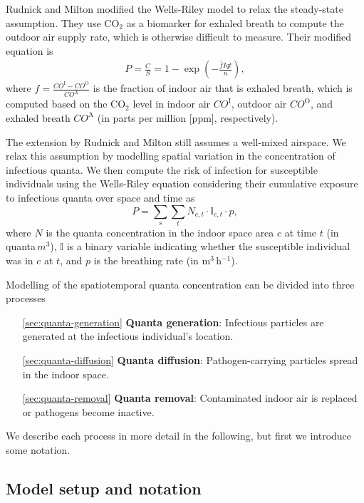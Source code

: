 \documentclass[fleqn,11pt]{wlscirep_supp}
\begin{document}
Rudnick and Milton\cite{Rudnick2003IndoorAir} modified the Wells-Riley model to relax the steady-state assumption. They use CO$_2$ as a biomarker for exhaled breath to compute the outdoor air supply rate, which is otherwise difficult to measure. Their modified equation is
\begin{align}
    P = \frac{C}{S} = 1 - \exp \left(-\frac{\bar{f}Iqt}{n}\right),
\end{align}
where $f = \frac{CO^{\text{I}}-CO^{\text{O}}}{CO^{\text{A}}}$ is the fraction of indoor air that is exhaled breath, which is computed based on the CO$_2$ level in indoor air $CO^{\text{I}}$, outdoor air $CO^{\text{O}}$, and exhaled breath $CO^{\text{A}}$ (in parts per million [ppm], respectively). 

The extension by Rudnick and Milton still assumes a well-mixed airspace. We relax this assumption by modelling spatial variation in the concentration of infectious quanta. We then compute the risk of infection for susceptible individuals using the Wells-Riley equation considering their cumulative exposure to infectious quanta over space and time as 
\begin{equation}\label{eq:spattemp-P}
    P = \sum_s \sum_t N_{c,t} \cdot \mathbb{I}_{c,t} \cdot p,
\end{equation}
where $N$ is the quanta concentration in the indoor space area $c$ at time $t$ (in quanta\,$m^3$), $\mathbb{I}$ is a binary variable indicating whether the susceptible individual was in $c$ at $t$, and $p$ is the breathing rate (in m$^3$\,h$^{-1}$). 

Modelling of the spatiotemporal quanta concentration can be divided into three processes
\begin{itemize}
    \item[\ref{sec:quanta-generation}] \textbf{Quanta generation}: Infectious particles are generated at the infectious individual's location. 
    \item[\ref{sec:quanta-diffusion}] \textbf{Quanta diffusion}: Pathogen-carrying particles spread in the indoor space. 
    \item[\ref{sec:quanta-removal}] \textbf{Quanta removal}: Contaminated indoor air is replaced or pathogens become inactive. 
\end{itemize}
We describe each process in more detail in the following, but first we introduce some notation. 

\subsection{Model setup and notation}
\end{document}
